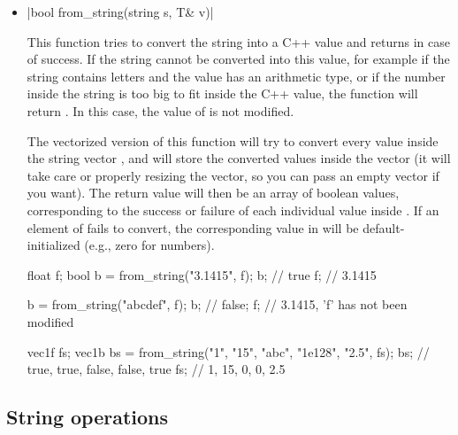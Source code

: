 \documentclass[12pt]{report}
\newcommand*\circled[1]{\tikz[baseline=(char.base)]{
            \node[shape=circle,draw,inner sep=0.0pt] (char) {#1};}}
\newcommand{\vectorfuncsym}{\circled{$\hspace{-1pt}\mathcal{V}$}\xspace}
\newcommand{\vectorfunc}{\vectorfuncsym\hspace{2pt}\xspace}
\newenvironment{example}
{
    \begin{mdframed}[style=example,frametitle={Example}]
}
{
    \end{mdframed}
}
\newcommand{\cpptrue}{\cppinline{true}\xspace}
\newcommand{\cppfalse}{\cppinline{false}\xspace}
\begin{document}
\begin{itemize}
\item \vectorfunc \cppinline|bool from_string(string s, T& v)| 

This function tries to convert the string  into a C++ value  and returns \cpptrue in case of success. If the string cannot be converted into this value, for example if the string contains letters and the value has an arithmetic type, or if the number inside the string is too big to fit inside the C++ value, the function will return \cppfalse. In this case, the value of  is not modified.

The vectorized version of this function will try to convert every value inside the string vector , and will store the converted values inside the vector  (it will take care or properly resizing the vector, so you can pass an empty vector if you want). The return value will then be an array of boolean values, corresponding to the success or failure of each individual value inside . If an element of  fails to convert, the corresponding value in  will be default-initialized (e.g., zero for numbers).

\begin{example}
\begin{cppcode}
float f;
bool b = from_string("3.1415", f);
b; // true
f; // 3.1415

b = from_string("abcdef", f);
b; // false;
f; // 3.1415, 'f' has not been modified

vec1f fs;
vec1b bs = from_string({"1", "15", "abc", "1e128", "2.5"}, fs);
bs; // {true, true, false, false, true}
fs; // {1,    15,   0,     0,     2.5}
\end{cppcode}
\end{example}

\end{itemize}

\subsection{String operations \label{SEC:support:string:modify}}
\end{document}
